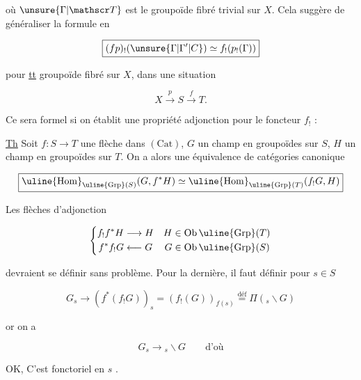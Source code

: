 
où $\unsure{\Gamma|\mathscr T}$ est le groupoïde fibré trivial sur $X$. Cela suggère de généraliser la formule  en

\[
\boxed{(fp)_!(\unsure{\Gamma|\Gamma'|C})\simeq f_!(p_!(\Gamma))}
\]

pour \uline{tt} groupoïde fibré sur $X$, dans une situation

\[
X\xrightarrow{p}S\xrightarrow{f}T.
\]

Ce sera formel si on établit une propriété  adjonction pour le foncteur $f_!$ : 

\uline{Th} Soit $f\colon S\longrightarrow T$ une  flèche dans $(\mathrm{Cat})$, $G$ un champ en groupoïdes sur $S$, $H$ un champ en groupoïdes sur $T$. On a alors une équivalence de catégories canonique

\[
\boxed{\uline{\mathrm{Hom}}_{\uline{\mathrm{Grp}}(S)}(G,f^*H)
\simeq\uline{\mathrm{Hom}}_{\uline{\mathrm{Grp}}(T)}(f_!G,H)}
\]

Les flèches d'adjonction

\[
\left\{\begin{aligned}
f_!f^*H&\longrightarrow H & H&\in\mathrm{Ob}\,\uline{\mathrm{Grp}}(T)\\
f^*f_!G&\longleftarrow G & G&\in\mathrm{Ob}\,\uline{\mathrm{Grp}}(S)
\end{aligned}\right.
\]

devraient se définir sans problème. Pour la dernière, il faut définir pour $s\in S$

\[
G_s\longrightarrow(f^*(f_!G))_s=(f_!(G))_{f(s)}
\overset{\text{déf}}{=}\Pi({}_{s}\backslash G)
\]

or on a

\[
G_s\longrightarrow {}_{s}\backslash G\qquad\text{d'où}
\]


OK, C'est fonctoriel en $s$ \unsure{\ldots}.
